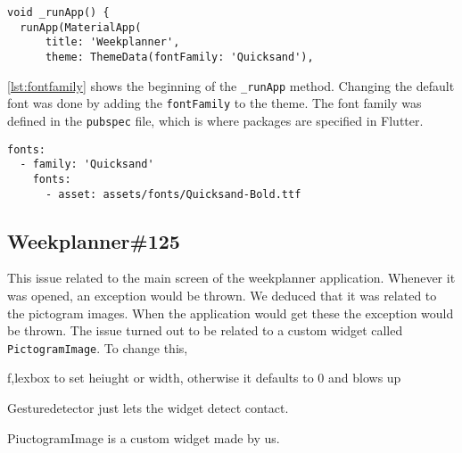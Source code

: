 \begin{lstlisting}[caption={An excerpt of the run method},label={lst:fontfamily}]
  void _runApp() {
  runApp(MaterialApp(
      title: 'Weekplanner',
      theme: ThemeData(fontFamily: 'Quicksand'),
\end{lstlisting}
\autoref{lst:fontfamily} shows the beginning of the \texttt{\_runApp} method.
Changing the default font was done by adding the \texttt{fontFamily} to the theme.
The font family was defined in the \texttt{pubspec} file, which is where packages are specified in Flutter.
\begin{lstlisting}[caption={An excerpt of the pubspec file. Multiple assets are in the file for different styles, such as regular font.},label={lst:fontpubspec}]
  fonts:
  - family: 'Quicksand'
    fonts:
      - asset: assets/fonts/Quicksand-Bold.ttf
\end{lstlisting}
\subsection{Weekplanner\#125}
This issue related to the main screen of the weekplanner application.
Whenever it was opened, an exception would be thrown.
We deduced that it was related to the pictogram images. 
When the application would get these the exception would be thrown.
The issue turned out to be related to a custom widget called \texttt{PictogramImage}.
To change this, 


f,lexbox to set heiught or width, otherwise it defaults to 0 and blows up

Gesturedetector just lets the widget detect contact.

PiuctogramImage is a custom widget made by us.